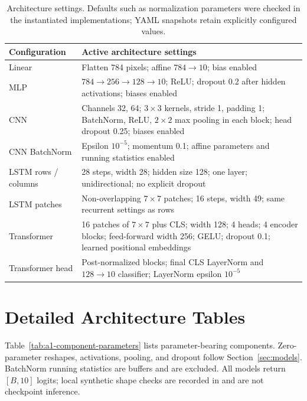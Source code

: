 \begin{table}[H]
    \centering
    \caption{Architecture settings. Defaults such as normalization parameters were checked in the instantiated implementations; YAML snapshots retain explicitly configured values.}
    \small
    \begin{tabularx}{\textwidth}{@{}lY@{}}
        \toprule
        Configuration & Active architecture settings \\
        \midrule
        Linear & Flatten 784 pixels; affine $784\to10$; bias enabled \\
        MLP & $784\to256\to128\to10$; ReLU; dropout 0.2 after hidden activations; biases enabled \\
        CNN & Channels 32, 64; $3\times3$ kernels, stride 1, padding 1; BatchNorm, ReLU, $2\times2$ max pooling in each block; head dropout 0.25; biases enabled \\
        CNN BatchNorm & Epsilon $10^{-5}$; momentum 0.1; affine parameters and running statistics enabled \\
        LSTM rows / columns & 28 steps, width 28; hidden size 128; one layer; unidirectional; no explicit dropout \\
        LSTM patches & Non-overlapping $7\times7$ patches; 16 steps, width 49; same recurrent settings as rows \\
        Transformer & 16 patches of $7\times7$ plus CLS; width 128; 4 heads; 4 encoder blocks; feed-forward width 256; GELU; dropout 0.1; learned positional embeddings \\
        Transformer head & Post-normalized blocks; final CLS LayerNorm and $128\to10$ classifier; LayerNorm epsilon $10^{-5}$ \\
        \bottomrule
    \end{tabularx}
\end{table}

\section{Detailed Architecture Tables}
\label{app:architecture-tables}

Table~\ref{tab:a1-component-parameters} lists parameter-bearing components. Zero-parameter reshapes, activations, pooling, and dropout follow Section~\ref{sec:models}. BatchNorm running statistics are buffers and are excluded. All models return $[B,10]$ logits; local synthetic shape checks are recorded in  and are not checkpoint inference.

